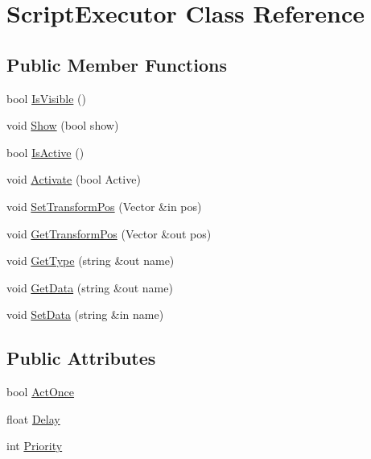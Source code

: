 \hypertarget{class_script_executor}{}\section{Script\+Executor Class Reference}
\label{class_script_executor}
\subsection*{Public Member Functions}
\begin{DoxyCompactItemize}
\item 
bool \hyperlink{class_script_executor_a456e506ec644ca7d672ca7b719d544c6}{Is\+Visible} ()
\item 
void \hyperlink{class_script_executor_a00b402dfcc634316cfaa4ba4ce108c68}{Show} (bool show)
\item 
bool \hyperlink{class_script_executor_a046f3bfe3d4869072c381d302b2d2b2c}{Is\+Active} ()
\item 
void \hyperlink{class_script_executor_aa1459b94b16e14a17e02fd2fd0aefd8b}{Activate} (bool Active)
\item 
void \hyperlink{class_script_executor_a392598ab139da46ff003216549f94e3e}{Set\+Transform\+Pos} (Vector \&in pos)
\item 
void \hyperlink{class_script_executor_af789f74e9ebe3a84c84f0d57bf9a5a0b}{Get\+Transform\+Pos} (Vector \&out pos)
\item 
void \hyperlink{class_script_executor_a59b35ffd0d2ee12acdce9fe32b8ebdb0}{Get\+Type} (string \&out name)
\item 
void \hyperlink{class_script_executor_ae89049083a1e0028ab6b34536153a38f}{Get\+Data} (string \&out name)
\item 
void \hyperlink{class_script_executor_a49a0a9223c11a536b4c573e78a46a43f}{Set\+Data} (string \&in name)
\end{DoxyCompactItemize}
\subsection*{Public Attributes}
\begin{DoxyCompactItemize}
\item 
bool \hyperlink{class_script_executor_a32e9e5d277a3b45efffe0e0c68817b9c}{Act\+Once}
\item 
float \hyperlink{class_script_executor_a934f2b98ec61c94d5a28571f8323f6b1}{Delay}
\item 
int \hyperlink{class_script_executor_a2e289ae120dd8dac6366c15eab9dd758}{Priority}
\end{DoxyCompactItemize}


